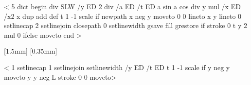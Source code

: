 <%
    5 dict begin
    \pst@arrowscale\space div SLW  %
    /y ED                      %
    2 div /a ED                %
    /t ED                      %
    a sin a cos div y mul /x ED        %
    /x2 x dup add def
    t { 1 -1 scale } if        %
    newpath
    x neg y moveto             %
    0 0 lineto                 %
    x y lineto                 %
    0 setlinecap               %
    2 setlinejoin              %
    { closepath 0 setlinewidth gsave fill grestore } if    %
    \ps@check@tipcolor
    stroke                %
    0 t { y 2 mul } { 0 } ifelse moveto
    end
>    %



[1.5mm]{\psk@tickarrowlength}
[0.35mm]{\psk@tickarrowlinewidth}

<%
    1 setlinecap            %
    1 setlinejoin            %
    setlinewidth            %
    /y ED                %
    /t ED                %
    t { 1 -1 scale } if            %
    y neg y moveto            %
    y y neg L                %
    \ps@check@tipcolor
    stroke                %
    0 0 moveto>                %



